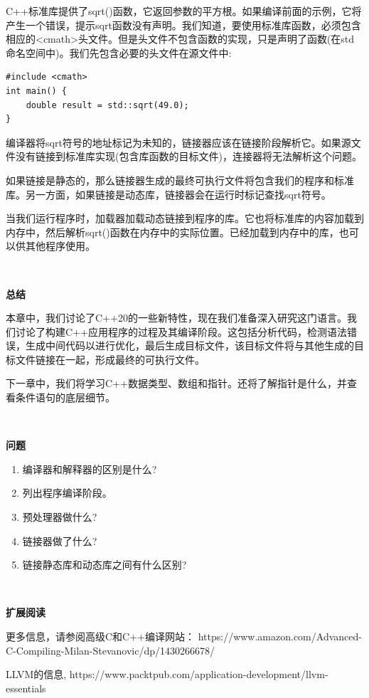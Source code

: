 C++标准库提供了sqrt()函数，它返回参数的平方根。如果编译前面的示例，它将产生一个错误，提示sqrt函数没有声明。我们知道，要使用标准库函数，必须包含相应的<cmath>头文件。但是头文件不包含函数的实现，只是声明了函数(在std命名空间中)。我们先包含必要的头文件在源文件中: \par

\begin{lstlisting}[caption={}]
#include <cmath>
int main() {
	double result = std::sqrt(49.0);
}
\end{lstlisting}

编译器将sqrt符号的地址标记为未知的，链接器应该在链接阶段解析它。如果源文件没有链接到标准库实现(包含库函数的目标文件)，连接器将无法解析这个问题。 \par
如果链接是静态的，那么链接器生成的最终可执行文件将包含我们的程序和标准库。另一方面，如果链接是动态库，链接器会在运行时标记查找sqrt符号。 \par
当我们运行程序时，加载器加载动态链接到程序的库。它也将标准库的内容加载到内存中，然后解析sqrt()函数在内存中的实际位置。已经加载到内存中的库，也可以供其他程序使用。 \par

\noindent\textbf{}\ \par
\textbf{总结}\ \par
本章中，我们讨论了C++20的一些新特性，现在我们准备深入研究这门语言。我们讨论了构建C++应用程序的过程及其编译阶段。这包括分析代码，检测语法错误，生成中间代码以进行优化，最后生成目标文件，该目标文件将与其他生成的目标文件链接在一起，形成最终的可执行文件。 \par
下一章中，我们将学习C++数据类型、数组和指针。还将了解指针是什么，并查看条件语句的底层细节。\par

\noindent\textbf{}\ \par
\textbf{问题}\ \par
\begin{enumerate}
	\item 编译器和解释器的区别是什么?
	\item 列出程序编译阶段。
	\item 预处理器做什么?
	\item 链接器做了什么?
	\item 链接静态库和动态库之间有什么区别?
\end{enumerate}

\noindent\textbf{}\ \par
\textbf{扩展阅读}\ \par
更多信息，请参阅高级C和C++编译网站： https:/​/​www.​amazon.​com/Advanced-​C-​Compiling-​Milan-​Stevanovic/​dp/​1430266678/​\par
LLVM的信息, https://www.packtpub.com/application-development/llvm-essentials \par
\newpage





























